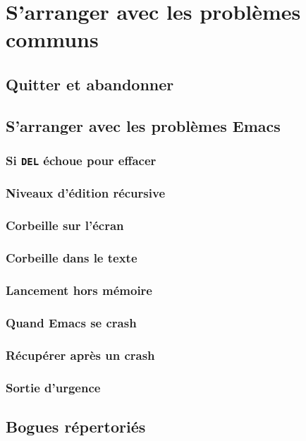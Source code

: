 \chapter{S'arranger avec les problèmes communs}\label{chap34}
\section{Quitter et abandonner}\label{chap34sec1}
\section{S'arranger avec les problèmes Emacs}\label{chap34sec2}
\subsection{Si \texttt{DEL} échoue pour effacer}\label{chap34sec2subsec1}
\subsection{Niveaux d'édition récursive}\label{chap34sec2subsec2}
\subsection{Corbeille sur l'écran}\label{chap34sec2subsec3}
\subsection{Corbeille dans le texte}\label{chap34sec2subsec4}
\subsection{Lancement hors mémoire}\label{chap34sec2subsec5}
\subsection{Quand Emacs se crash}\label{chap34sec2subsec6}
\subsection{Récupérer après un crash}\label{chap34sec2subsec7}
\subsection{Sortie d'urgence}\label{chap34sec2subsec8}
\section{Bogues répertoriés}\label{chap34sec3}
